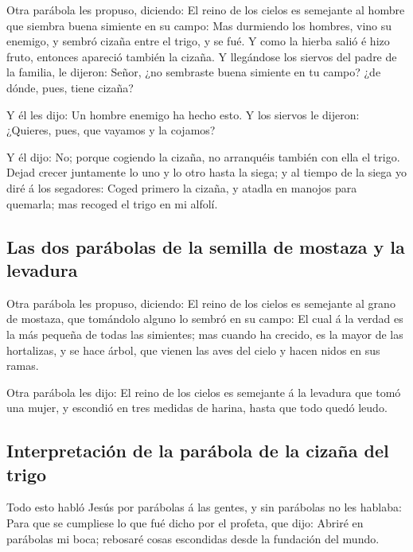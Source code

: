  Otra parábola les propuso, diciendo: El reino de los
cielos es semejante al hombre que siembra buena simiente en su campo:
 Mas durmiendo los hombres, vino su enemigo, y sembró
cizaña entre el trigo, y se fué.  Y como la hierba salió é
hizo fruto, entonces apareció también la cizaña.  Y
llegándose los siervos del padre de la familia, le dijeron: Señor, ¿no
sembraste buena simiente en tu campo? ¿de dónde, pues, tiene cizaña?

 Y él les dijo: Un hombre enemigo ha hecho esto. Y los
siervos le dijeron: ¿Quieres, pues, que vayamos y la cojamos?

 Y él dijo: No; porque cogiendo la cizaña, no arranquéis
también con ella el trigo.  Dejad crecer juntamente lo uno
y lo otro hasta la siega; y al tiempo de la siega yo diré á los
segadores: Coged primero la cizaña, y atadla en manojos para quemarla;
mas recoged el trigo en mi alfolí.

\hypertarget{las-dos-paruxe1bolas-de-la-semilla-de-mostaza-y-la-levadura}{%
\subsection{Las dos parábolas de la semilla de mostaza y la
levadura}\label{las-dos-paruxe1bolas-de-la-semilla-de-mostaza-y-la-levadura}}

 Otra parábola les propuso, diciendo: El reino de los
cielos es semejante al grano de mostaza, que tomándolo alguno lo sembró
en su campo:  El cual á la verdad es la más pequeña de
todas las simientes; mas cuando ha crecido, es la mayor de las
hortalizas, y se hace árbol, que vienen las aves del cielo y hacen nidos
en sus ramas.

 Otra parábola les dijo: El reino de los cielos es
semejante á la levadura que tomó una mujer, y escondió en tres medidas
de harina, hasta que todo quedó leudo.

\hypertarget{interpretaciuxf3n-de-la-paruxe1bola-de-la-cizauxf1a-del-trigo}{%
\subsection{Interpretación de la parábola de la cizaña del
trigo}\label{interpretaciuxf3n-de-la-paruxe1bola-de-la-cizauxf1a-del-trigo}}

 Todo esto habló Jesús por parábolas á las gentes, y sin
parábolas no les hablaba:  Para que se cumpliese lo que fué
dicho por el profeta, que dijo: Abriré en parábolas mi boca; rebosaré
cosas escondidas desde la fundación del mundo.

